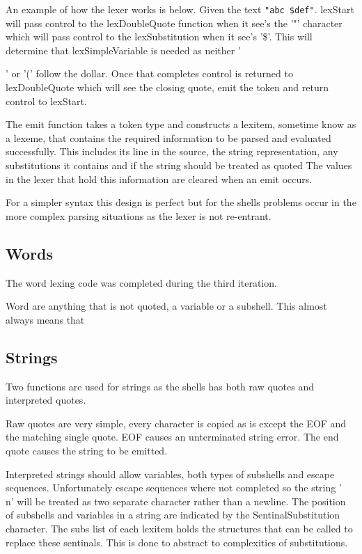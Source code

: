 An example of how the lexer works is below.
Given the text \verb!"abc $def"!.
lexStart will pass control to the lexDoubleQuote function when it see's the '"' character which will pass control to the lexSubstitution when it see's '\$'.
This will determine that lexSimpleVariable is needed as neither '{' or '(' follow the dollar.
Once that completes control is returned to lexDoubleQuote which will see the closing quote, emit the token and return control to lexStart.

The emit function takes a token type and constructs a lexitem, sometime know as a lexeme, that contains the required information to be parsed and evaluated successfully.
This includes its line in the source, the string representation, any substitutions it contains and if the string should be treated as quoted
The values in the lexer that hold this information are cleared when an emit occurs.

For a simpler syntax this design is perfect but for the shells problems occur in the more complex parsing situations as the lexer is not re-entrant.

\subsection{Words}
The word lexing code was completed during the third iteration.

Word are anything that is not quoted, a variable or a subshell.
This almost always means that
\subsection{Strings}
Two functions are used for strings as the shells has both raw quotes and interpreted quotes.

Raw quotes are very simple, every character is copied as is except the EOF and the matching single quote.
EOF causes an unterminated string error.
The end quote causes the string to be emitted.

Interpreted strings should allow variables, both types of subshells and escape sequences.
Unfortunately escape sequences where not completed so the string '\\n' will be treated as two separate character rather than a newline.
The position of subshells and variables in a string are indicated by the SentinalSubstitution character.
The subs list of each lexitem holds the structures that can be called to replace these sentinals.
This is done to abstract to complexities of substitutions.

}
